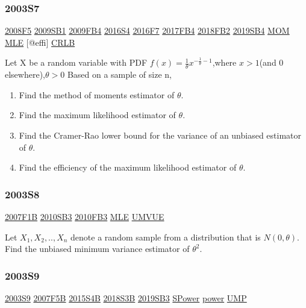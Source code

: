 \documentclass[10pt,twocolumn,portrait]{article}
\begin{document}
\hypertarget{s7}{%
\subsubsection{2003S7}\label{s7}}

\protect\hyperlink{f5-3}{2008F5} \protect\hyperlink{sb1}{2009SB1}
\protect\hyperlink{fb4}{2009FB4} \protect\hyperlink{s4-4}{2016S4}
\protect\hyperlink{f7-5}{2016F7} \protect\hyperlink{fb4-3}{2017FB4}
\protect\hyperlink{fb2-4}{2018FB2} \protect\hyperlink{sb4-2}{2019SB4}
\protect\hyperlink{section-2}{MOM} \protect\hyperlink{MLE}{MLE}
{[}@effi{]} \protect\hyperlink{section-5}{CRLB}

Let X be a random variable with PDF
\(f(x)=\frac1\theta x^{-\frac1\theta-1}\),where \(x>1\)(and 0
elsewhere),\(\theta>0\) Based on a sample of size n,

\begin{enumerate}
\def\labelenumi{\Alph{enumi})}
\item
  Find the method of moments estimator of \(\theta\).
\item
  Find the maximum likelihood estimator of \(\theta\).
\item
  Find the Cramer-Rao lower bound for the variance of an unbiased
  estimator of \(\theta\).
\item
  Find the efficiency of the maximum likelihood estimator of \(\theta\).
\end{enumerate}

\hypertarget{s8}{%
\subsubsection{2003S8}\label{s8}}

\protect\hyperlink{f1b}{2007F1B} \protect\hyperlink{sb3-1}{2010SB3}
\protect\hyperlink{fb3-1}{2010FB3} \protect\hyperlink{MLE}{MLE}
\protect\hyperlink{section-5}{UMVUE}

Let \(X_1,X_2,..,X_n\) denote a random sample from a distribution that
is \(N(0,\theta)\). Find the unbiased minimum variance estimator of
\(\theta^2\).

\hypertarget{s9}{%
\subsubsection{2003S9}\label{s9}}

\protect\hyperlink{s9}{2003S9} \protect\hyperlink{f5b}{2007F5B}
\protect\hyperlink{s4b-1}{2015S4B} \protect\hyperlink{s3b-2}{2018S3B}
\protect\hyperlink{sb3-3}{2019SB3} \protect\hyperlink{SPower}{SPower}
\protect\hyperlink{power}{power} \protect\hyperlink{section-7}{UMP}
\end{document}
